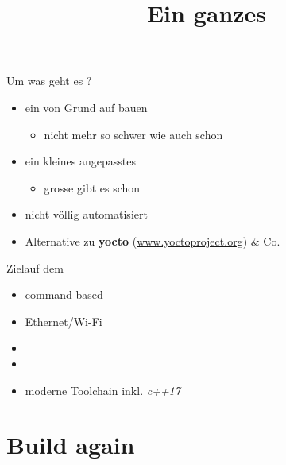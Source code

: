 \documentclass{beamer}
\begin{document}
\title[Build]{Ein ganzes \linux}

\frame{\titlepage}

\begin{frame}{Um was geht es ?}
 \begin{itemize}
  \item ein \linux von Grund auf bauen
  \begin{itemize}
   \item nicht mehr so schwer wie auch schon
  \end{itemize}
  \item ein kleines angepasstes \linux
  \begin{itemize}
   \item grosse \linux gibt es schon
  \end{itemize}
  \item nicht völlig automatisiert
  \item Alternative zu {\bf yocto} (\url{www.yoctoproject.org}) \& Co. 
 \end{itemize}
\end{frame}

\begin{frame}{Ziel}{\linux auf dem \target}
\begin{itemize}
 \item command based
 \item Ethernet/Wi-Fi
 \item {} 
 \item {}
 \item moderne Toolchain inkl. {\em c++17} \cpp
\end{itemize}
\end{frame}









\part{Build again}
\frame{\titlepage}
\frame{\partpage}

\end{document}
